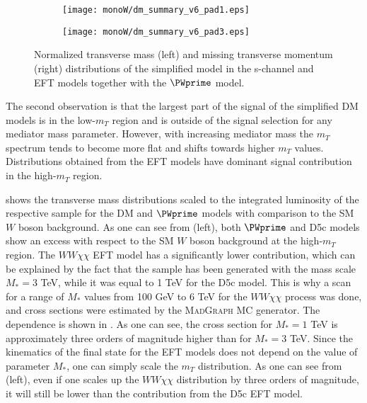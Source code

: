 \begin{figure}[]
\begin{subfigure}{.5\textwidth}
  \centering
  \texttt{[image: monoW/dm\_summary\_v6\_pad1.eps]}
\end{subfigure}%
\begin{subfigure}{.5\textwidth}
  \centering
  \texttt{[image: monoW/dm\_summary\_v6\_pad3.eps]}
\end{subfigure}
\caption{Normalized transverse mass (left) and missing transverse momentum (right) distributions of the simplified model in the s-channel and EFT models together with the $\PWprime$ model.}
  \label{fig:kinematicsSChannel}
\end{figure}

The second observation is that the largest part of the signal of the simplified DM models 
is in the low-$m_{T}$ region and is outside of the signal selection for any mediator mass parameter.
However, with increasing mediator mass the $m_{T}$ spectrum tends to become 
more flat and shifts towards higher $m_{T}$ values.
Distributions obtained from the EFT models have dominant signal contribution in the high-$m_T$ region.

 shows the transverse mass distributions
scaled to the integrated luminosity of the respective sample for the DM and $\PWprime$ models with comparison to the SM $W$ boson background.
As one can see from  (left), both $\PWprime$ and 
D5c models show an excess with respect to the SM $W$ boson background at the high-$m_T$ region. The $WW\chi\chi$ EFT model has a significantly lower contribution, which can be explained by the fact that the sample has been generated with the mass scale $M_{*} = 3$ TeV, while it was equal to 1 TeV for the D5c model. 
This is why a scan for a range of $M_{*}$ values from 100 GeV to 6 TeV for the $WW\chi\chi$ process was done, and cross sections were estimated by the M{\scshape ad}G{\scshape raph} MC generator.
The dependence is shown in .
As one can see, the cross section for $M_{*} = 1$ TeV is approximately three orders of magnitude higher than for $M_{*} = 3$ TeV.
Since the kinematics of the final state for the EFT models does not depend on the value of parameter $M_{*}$, one can simply scale the $m_T$ distribution.
As one can see from  (left), even if one scales up the $WW\chi\chi$ distribution by three orders of magnitude, it will still be lower than the contribution from the D5c EFT model.

